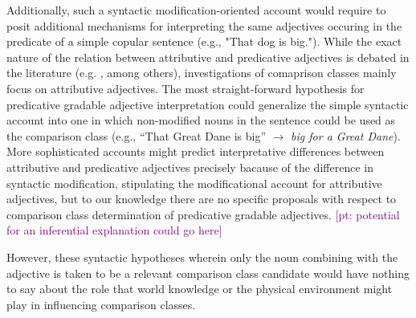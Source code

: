 \documentclass[a4paper,man,natbib]{apa6}
\newcommand{\pt}[1]{\textcolor{Purple}{[pt: #1]}}
\begin{document}
Additionally, such a syntactic modification-oriented account would require to posit additional mechanisms for interpreting the same adjectives occuring in the predicate of a simple copular sentence (e.g., "That dog is big."). While the exact nature of the relation between attributive and predicative adjectives is debated in the literature (e.g. \cite{Kamp1975}, \cite{McNally2010} among others), investigations of comaprison classes mainly focus on attributive adjectives. 
The most straight-forward hypothesis for predicative gradable adjective interpretation could generalize the simple syntactic account into one in which non-modified nouns in the sentence could be used as the comparison class (e.g., ``That Great Dane is big'' $\rightarrow$ \emph{big for a Great Dane}). More sophisticated accounts might predict interpretative differences between attributive and predicative adjectives precisely bacause of the difference in syntactic modification, stipulating the modificational account for attributive adjectives, but to our knowledge there are no specific proposals with respect to comparison class determination of predicative gradable adjectives.  \pt{potential for an inferential explanation could go here}

However, these syntactic hypotheses wherein only the noun combining with the adjective is taken to be a relevant comparison class candidate would have nothing to say about the role that world knowledge or the physical environment might play in influencing comparison classes.





\end{document}
